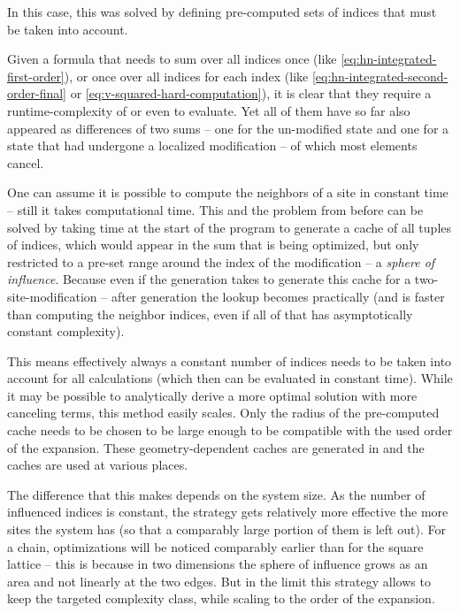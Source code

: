 In this case, this was solved by defining pre-computed sets of indices that must be taken into account.

Given a formula that needs to sum over all indices once (like \autoref{eq:hn-integrated-first-order}), or once over all indices for each index (like \autoref{eq:hn-integrated-second-order-final} or \autoref{eq:v-squared-hard-computation}), it is clear that they require a runtime-complexity of  or even  to evaluate.
Yet all of them have so far also appeared as differences of two sums -- one for the un-modified state and one for a state that had undergone a localized modification -- of which most elements cancel.

One can assume it is possible to compute the neighbors of a site in constant time -- still it takes computational time.
This and the problem from before can be solved by taking time at the start of the program to generate a cache of all tuples of indices, which would appear in the sum that is being optimized, but only restricted to a pre-set range around the index of the modification -- a \emph{sphere of influence}.
Because even if the generation takes  to generate this cache for a two-site-modification -- after generation the lookup becomes practically  (and is faster than computing the neighbor indices, even if all of that has asymptotically constant complexity).

This means effectively always a constant number of indices needs to be taken into account for all calculations (which then can be evaluated in constant time).
While it may be possible to analytically derive a more optimal solution with more canceling terms, this method easily scales.
Only the radius of the pre-computed cache needs to be chosen to be large enough to be compatible with the used order of the expansion.
These geometry-dependent caches are generated in  and the caches are used at various places.

The difference that this makes depends on the system size. 
As the number of influenced indices is constant, the strategy gets relatively more effective the more sites the system has (so that a comparably large portion of them is left out).
For a chain, optimizations will be noticed comparably earlier than for the square lattice -- this is because in two dimensions the sphere of influence grows as an area and not linearly at the two edges.
But in the limit this strategy allows to keep the targeted complexity class, while scaling to the order of the expansion.